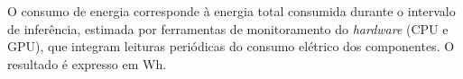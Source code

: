 {%
O consumo de energia corresponde à energia total consumida durante o intervalo de
inferência, estimada por ferramentas de monitoramento do \textit{hardware} (CPU e GPU), que
integram leituras periódicas do consumo elétrico dos componentes. O resultado é expresso em
Wh.

}
